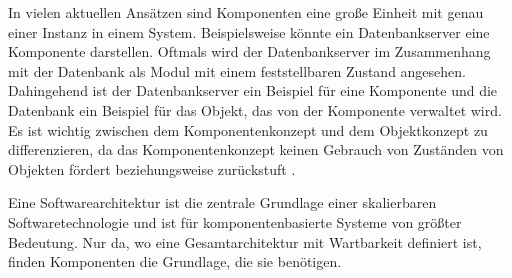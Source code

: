 In vielen aktuellen Ansätzen sind Komponenten eine große Einheit mit genau einer Instanz in einem System. Beispielsweise könnte ein Datenbankserver eine Komponente darstellen. Oftmals wird der Datenbankserver im Zusammenhang mit der Datenbank als Modul mit einem feststellbaren Zustand angesehen. Dahingehend ist der Datenbankserver ein Beispiel für eine Komponente und die Datenbank ein Beispiel für das Objekt, das von der Komponente verwaltet wird. Es ist wichtig zwischen dem Komponentenkonzept und dem Objektkonzept zu differenzieren, da das Komponentenkonzept keinen Gebrauch von Zuständen von Objekten fördert beziehungsweise zurückstuft \citereset \autocite[siehe][S. 35-38]{Szyperski.2002}.

Eine Softwarearchitektur ist die zentrale Grundlage einer skalierbaren Softwaretechnologie und ist für komponentenbasierte Systeme von größter Bedeutung. Nur da, wo eine Gesamtarchitektur mit Wartbarkeit definiert ist, finden Komponenten die Grundlage, die sie benötigen.
